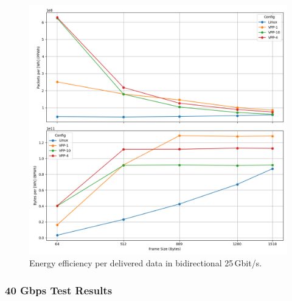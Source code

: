 \begin{figure}[!htbp]
    \centering
    \includegraphics[width=\linewidth]{images/consumption-bi-25g.png}
    \caption{Energy efficiency per delivered data in bidirectional 25\,Gbit/s.}
    \label{fig:bi-25g}
\end{figure}



\subsubsection{40 Gbps Test Results}

